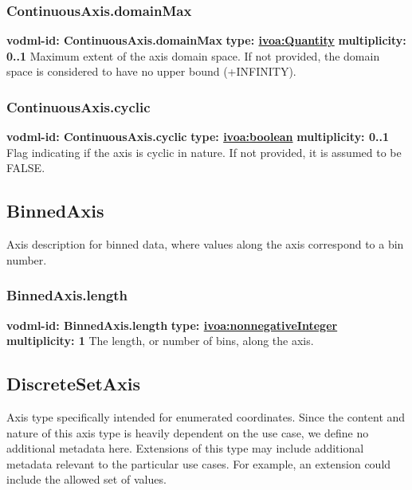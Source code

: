     \subsubsection{ContinuousAxis.domainMax}
      \textbf{vodml-id: ContinuousAxis.domainMax} \newline
      \textbf{type: \hyperref[sect:ivoa]{ivoa:Quantity}} \newline
      \textbf{multiplicity: 0..1} \newline 
      Maximum extent of the axis domain space. If not provided, the domain space is considered to have no upper bound (+INFINITY).

    \subsubsection{ContinuousAxis.cyclic}
      \textbf{vodml-id: ContinuousAxis.cyclic} \newline
      \textbf{type: \hyperref[sect:ivoa]{ivoa:boolean}} \newline
      \textbf{multiplicity: 0..1} \newline 
      Flag indicating if the axis is cyclic in nature. If not provided, it is assumed to be FALSE.

  \subsection{BinnedAxis}
  \label{sect:BinnedAxis}
    Axis description for binned data, where values along the axis correspond to a bin number.

    \subsubsection{BinnedAxis.length}
      \textbf{vodml-id: BinnedAxis.length} \newline
      \textbf{type: \hyperref[sect:ivoa]{ivoa:nonnegativeInteger}} \newline
      \textbf{multiplicity: 1} \newline 
      The length, or number of bins, along the axis.

  \subsection{DiscreteSetAxis}
  \label{sect:DiscreteSetAxis}
    Axis type specifically intended for enumerated coordinates. Since the content and nature of this axis type is heavily dependent on the use case, we define no additional metadata here. Extensions of this type may include additional metadata relevant to the particular use cases. For example, an extension could include the allowed set of values.


